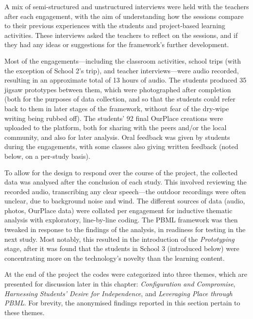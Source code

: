 A mix of semi-structured and unstructured interviews were held with the teachers after each engagement, with the aim of understanding how the sessions compare to their previous experiences with the students and project-based learning activities. These interviews asked the teachers to reflect on the sessions, and if they had any ideas or suggestions for the framework's further development.

Most of the engagements---including the classroom activities, school trips (with the exception of School 2's trip), and teacher interviews---were audio recorded, resulting in an approximate total of 13 hours of audio. The students produced 35 jigsaw prototypes between them, which were photographed after completion (both for the purposes of data collection, and so that the students could refer back to them in later stages of the framework, without fear of the dry-wipe writing being rubbed off). The students' 92 final OurPlace creations were uploaded to the platform, both for sharing with the peers and/or the local community, and also for later analysis. Oral feedback was given by students during the engagements, with some classes also giving written feedback (noted below, on a per-study basis).

To allow for the design to respond over the course of the project, the collected data was analysed after the conclusion of each study. This involved reviewing the recorded audio, transcribing any clear speech---the outdoor recordings were often unclear, due to background noise and wind. The different sources of data (audio, photos, OurPlace data) were collated per engagement for inductive thematic analysis with exploratory, line-by-line coding. The PBML framework was then tweaked in response to the findings of the analysis, in readiness for testing in the next study. Most notably, this resulted in the introduction of the \textit{Prototyping} stage, after it was found that the students in School 3 (introduced below) were concentrating more on the technology's novelty than the learning content.

At the end of the project the codes were categorized into three themes, which are presented for discussion later in this chapter: \textit{Configuration and Compromise}, \textit{Harnessing Students' Desire for Independence}, and \textit{Leveraging Place through PBML}. For brevity, the anonymised findings reported in this section pertain to these themes.

